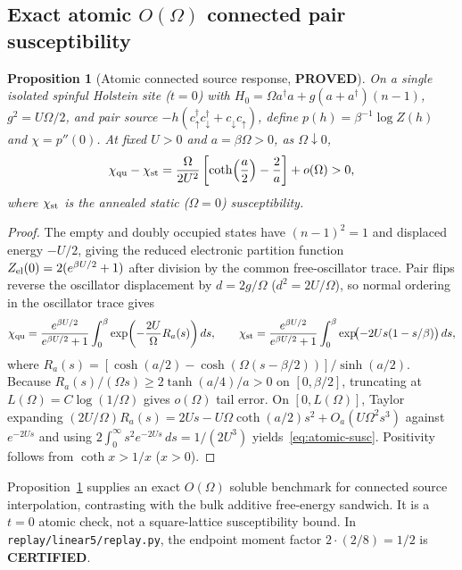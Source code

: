 \documentclass[11pt]{article}
\newtheorem{proposition}{Proposition}
\theoremstyle{remark}
\newcommand{\proved}{\textbf{PROVED}}
\newcommand{\certified}{\textbf{CERTIFIED}}
\begin{document}
\subsection{Exact atomic \texorpdfstring{$O(\Omega)$}{O(Omega)} connected pair susceptibility}

\begin{proposition}[Atomic connected source response, \proved]\label{prop:atomic-susc}
On a single isolated spinful Holstein site ($t=0$) with $H_0=\Omega a^\dagger a+g(a+a^\dagger)(n-1)$, $g^2=U\Omega/2$, and pair source $-h(c_\uparrow^\dagger c_\downarrow^\dagger+c_\downarrow c_\uparrow)$, define $p(h)=\beta^{-1}\log Z(h)$ and $\chi=p''(0)$. At fixed $U>0$ and $a=\beta\Omega>0$, as $\Omega\downarrow 0$,
\begin{equation}\label{eq:atomic-susc}
 \chi_{\rm qu}-\chi_{\rm st}=\frac{\Omega}{2U^2}\left[\coth\!\left(\frac{a}{2}\right)-\frac{2}{a}\right]+o(\Omega)>0,
\end{equation}
where $\chi_{\rm st}$ is the annealed static ($\Omega=0$) susceptibility.
\end{proposition}

\begin{proof}
The empty and doubly occupied states have $(n-1)^2=1$ and displaced energy $-U/2$, giving the reduced electronic partition function $Z_{\rm el}(0)=2(e^{\beta U/2}+1)$ after division by the common free-oscillator trace. Pair flips reverse the oscillator displacement by $d=2g/\Omega$ ($d^2=2U/\Omega$), so normal ordering in the oscillator trace gives
\[
 \chi_{\rm qu}=\frac{e^{\beta U/2}}{e^{\beta U/2}+1}\int_0^\beta \exp\!\left(-\frac{2U}{\Omega}R_a(s)\right)ds,\qquad
 \chi_{\rm st}=\frac{e^{\beta U/2}}{e^{\beta U/2}+1}\int_0^\beta \exp\!\bigl(-2Us(1-s/\beta)\bigr)\,ds,
\]
where $R_a(s)=[\cosh(a/2)-\cosh(\Omega(s-\beta/2))]/\sinh(a/2)$. Because $R_a(s)/(\Omega s)\ge 2\tanh(a/4)/a>0$ on $[0,\beta/2]$, truncating at $L(\Omega)=C\log(1/\Omega)$ gives $o(\Omega)$ tail error. On $[0,L(\Omega)]$, Taylor expanding $(2U/\Omega)R_a(s)=2Us-U\Omega\coth(a/2)s^2+O_a(U\Omega^2s^3)$ against $e^{-2Us}$ and using $2\int_0^\infty s^2 e^{-2Us}\,ds=1/(2U^3)$ yields~\eqref{eq:atomic-susc}. Positivity follows from $\coth x>1/x$ ($x>0$).
\end{proof}

Proposition~\ref{prop:atomic-susc} supplies an exact $O(\Omega)$ soluble benchmark for connected source interpolation, contrasting with the bulk additive free-energy sandwich. It is a $t=0$ atomic check, not a square-lattice susceptibility bound. In \texttt{replay/linear5/replay.py}, the endpoint moment factor $2\cdot(2/8)=1/2$ is \certified{}.
\end{document}
